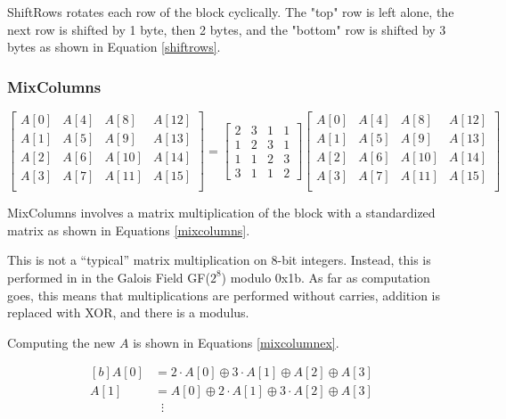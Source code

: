 \documentclass[a4paper,10pt]{article}
\begin{document}
ShiftRows rotates each row of the block cyclically.  The "top" row is left alone, the next row is shifted by 1 byte, then 2 bytes, and the "bottom" row is shifted by 3 bytes as shown in Equation \eqref{shiftrows}.

\subsubsection{MixColumns}

\begin{equation}
 \begin{bmatrix}
  A[0] & A[4] & A[8] & A[12] \\
  A[1] & A[5] & A[9] & A[13] \\
  A[2] & A[6] & A[10] & A[14] \\
  A[3] & A[7] & A[11] & A[15] \\
 \end{bmatrix}
 =
 \begin{bmatrix}
  2 & 3 & 1 & 1 \\
  1 & 2 & 3 & 1 \\
  1 & 1 & 2 & 3 \\
  3 & 1 & 1 & 2
 \end{bmatrix}
  \begin{bmatrix}
  A[0] & A[4] & A[8] & A[12] \\
  A[1] & A[5] & A[9] & A[13] \\
  A[2] & A[6] & A[10] & A[14] \\
  A[3] & A[7] & A[11] & A[15] \\
 \end{bmatrix}
 \label{mixcolumns}
\end{equation}

MixColumns involves a matrix multiplication of the block with a standardized matrix as shown in Equations \eqref{mixcolumns}.

This is not a ``typical'' matrix multiplication on 8-bit integers.  Instead, this is performed in in the Galois Field GF($2^8$) modulo 0x1b.  As far as computation goes, this means that multiplications are performed without carries, addition is replaced with XOR, and there is a modulus\cite{galois}.

Computing the new $A$ is shown in Equations \eqref{mixcolumnex}.

\begin{equation}
 \begin{aligned}[b]
  A[0] &= 2 \cdot A[0] \oplus 3 \cdot A[1] \oplus A[2] \oplus A[3] \\
  A[1] &= A[0] \oplus 2 \cdot A[1] \oplus 3 \cdot A[2] \oplus A[3] \\
  &\;\;\vdots
 \end{aligned}
 \label{mixcolumnex}
\end{equation}
\end{document}
